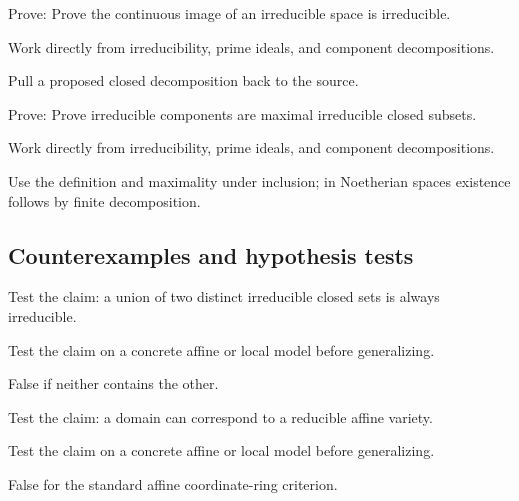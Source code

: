 \begin{exercise}\label{exr:vi05-expand-08}
Prove: Prove the continuous image of an irreducible space is irreducible.
\end{exercise}
\begin{hint}
Work directly from irreducibility, prime ideals, and component decompositions.
\end{hint}
\begin{solution}
Pull a proposed closed decomposition back to the source.
\end{solution}

\begin{exercise}\label{exr:vi05-expand-09}
Prove: Prove irreducible components are maximal irreducible closed subsets.
\end{exercise}
\begin{hint}
Work directly from irreducibility, prime ideals, and component decompositions.
\end{hint}
\begin{solution}
Use the definition and maximality under inclusion; in Noetherian spaces existence follows by finite decomposition.
\end{solution}

\subsection*{Counterexamples and hypothesis tests}

\begin{exercise}[Union]\label{exr:vi05-expand-10}
Test the claim: a union of two distinct irreducible closed sets is always irreducible.
\end{exercise}
\begin{hint}
Test the claim on a concrete affine or local model before generalizing.
\end{hint}
\begin{solution}
False if neither contains the other.
\end{solution}

\begin{exercise}\label{exr:vi05-expand-11}
Test the claim: a domain can correspond to a reducible affine variety.
\end{exercise}
\begin{hint}
Test the claim on a concrete affine or local model before generalizing.
\end{hint}
\begin{solution}
False for the standard affine coordinate-ring criterion.
\end{solution}


